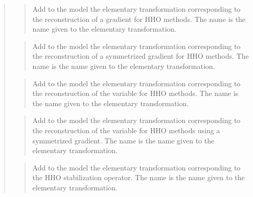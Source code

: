 \documentclass[a4paper,11pt,english]{sphinxmanual}
\begin{document}
\begin{quote}
\begin{quote}
\sphinxAtStartPar
Add to the model the elementary transformation corresponding to the
reconstruction of a gradient for HHO methods.
The name is the name given to the elementary transformation.
\end{quote}

\sphinxAtStartPar
{}
\begin{quote}

\sphinxAtStartPar
Add to the model the elementary transformation corresponding to the
reconstruction of a symmetrized gradient for HHO methods.
The name is the name given to the elementary transformation.
\end{quote}

\sphinxAtStartPar
{}
\begin{quote}

\sphinxAtStartPar
Add to the model the elementary transformation corresponding to the
reconstruction of the variable for HHO methods.
The name is the name given to the elementary transformation.
\end{quote}

\sphinxAtStartPar
{}
\begin{quote}

\sphinxAtStartPar
Add to the model the elementary transformation corresponding to the
reconstruction of the variable for HHO methods using a symmetrized
gradient.
The name is the name given to the elementary transformation.
\end{quote}

\sphinxAtStartPar
{}
\begin{quote}

\sphinxAtStartPar
Add to the model the elementary transformation corresponding to the
HHO stabilization operator.
The name is the name given to the elementary transformation.
\end{quote}

\sphinxAtStartPar
{}
\begin{quote}


\end{quote}
\end{quote}
\end{document}
